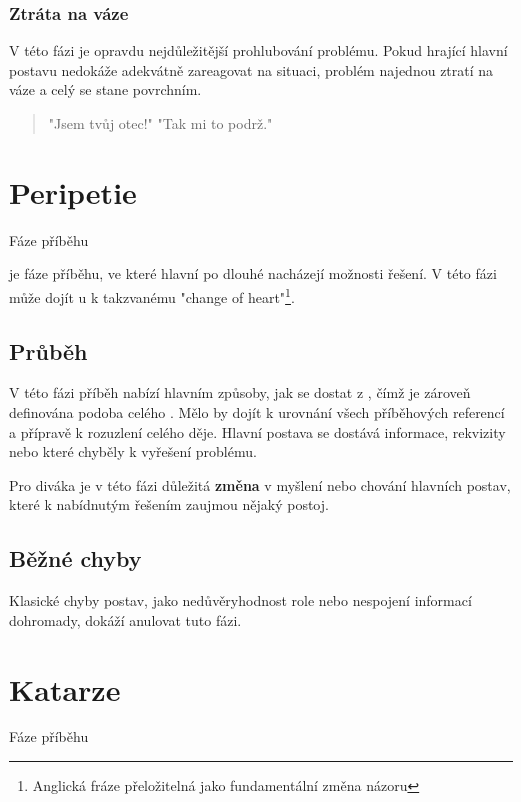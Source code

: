 \documentclass[main.tex]{subfiles}
\begin{document}
\subsubsection{ Ztráta na váze } V této fázi je opravdu nejdůležitější prohlubování problému. Pokud  hrající hlavní postavu nedokáže adekvátně zareagovat na situaci, problém najednou ztratí na váze a celý  se stane povrchním. 
 
\begin{quote} 
"Jsem tvůj otec!" 
"Tak mi to podrž." 
\end{quote} 
 
 
 
 
\needspace{5cm} \section{Peripetie} \label{peripetie} {{Fáze příběhu}} 
 
 je fáze příběhu, ve které hlavní  po dlouhé  nacházejí možnosti řešení. V této fázi může dojít u  k takzvanému "change of heart"\footnote{Anglická fráze přeložitelná jako fundamentální změna názoru}. 
 
\subsection{ Průběh } V této fázi příběh nabízí hlavním  způsoby, jak se dostat z , čímž je zároveň definována podoba  celého . Mělo by dojít k urovnání všech příběhových referencí a přípravě k rozuzlení celého děje. Hlavní postava se dostává informace, rekvizity nebo které chyběly k vyřešení problému. 
 
Pro diváka je v této fázi důležitá \textbf{změna}{} v myšlení nebo chování hlavních postav, které k nabídnutým řešením zaujmou nějaký postoj. 
 
\subsection{ Běžné chyby }  
Klasické chyby postav, jako nedůvěryhodnost role nebo nespojení informací dohromady, dokáží anulovat tuto fázi. 
 
  
 
 
\needspace{5cm} \section{Katarze} \label{katarze} {{Fáze příběhu}} 
 
\end{document}
